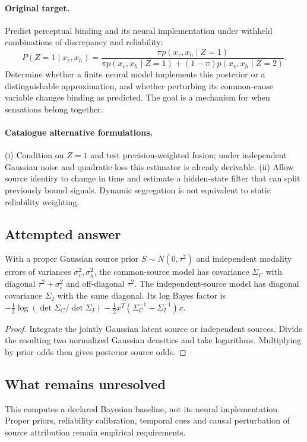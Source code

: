 \documentclass[11pt]{article}
\begin{document}
\paragraph{Original target.}
Predict perceptual binding and its neural implementation under withheld combinations of discrepancy and reliability:
\[
P(Z=1\mid x_v,x_h)=\frac{\pi p(x_v,x_h\mid Z=1)}{\pi p(x_v,x_h\mid Z=1)+(1-\pi)p(x_v,x_h\mid Z=2)}.
\]
Determine whether a finite neural model implements this posterior or a distinguishable approximation, and whether perturbing its common-cause variable changes binding as predicted. The goal is a mechanism for when sensations belong together.
\paragraph{Catalogue alternative formulations.}
(i) Condition on $Z=1$ and test precision-weighted fusion; under independent Gaussian noise and quadratic loss this estimator is already derivable. (ii) Allow source identity to change in time and estimate a hidden-state filter that can split previously bound signals. Dynamic segregation is not equivalent to static reliability weighting.
\subsection{Attempted answer}
\begin{proposition}
With a proper Gaussian source prior $S\sim N(0,\tau^2)$ and independent modality errors of variances $\sigma_v^2,\sigma_h^2$, the common-source model has covariance $\Sigma_C$ with diagonal $\tau^2+\sigma_i^2$ and off-diagonal $\tau^2$. The independent-source model has diagonal covariance $\Sigma_I$ with the same diagonal. Its log Bayes factor is $-\tfrac12\log(\det\Sigma_C/\det\Sigma_I)-\tfrac12x^T(\Sigma_C^{-1}-\Sigma_I^{-1})x$.
\end{proposition}
\begin{proof}
Integrate the jointly Gaussian latent source or independent sources. Divide the resulting two normalized Gaussian densities and take logarithms. Multiplying by prior odds then gives posterior source odds.
\end{proof}
\subsection{What remains unresolved}
This computes a declared Bayesian baseline, not its neural implementation. Proper priors, reliability calibration, temporal cues and causal perturbation of source attribution remain empirical requirements.
\end{document}
